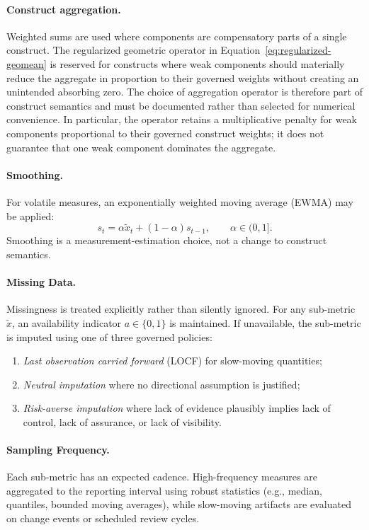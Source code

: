 \documentclass[11pt]{article}
\begin{document}
\paragraph{Construct aggregation.}
Weighted sums are used where components are compensatory parts of a single construct.
The regularized geometric operator in Equation~\ref{eq:regularized-geomean} is reserved
for constructs where weak components should materially reduce the aggregate in
proportion to their governed weights without creating an unintended absorbing zero. The choice of aggregation
operator is therefore part of construct semantics and must be documented rather than
selected for numerical convenience. In particular, the operator retains a
multiplicative penalty for weak components proportional to their governed construct
weights; it does not guarantee that one weak component dominates the aggregate.

\paragraph{Smoothing.}
For volatile measures, an exponentially weighted moving average (EWMA) may be applied:
\begin{equation}
  s_t=\alpha \widetilde{x}_t+(1-\alpha)s_{t-1},\qquad \alpha\in(0,1].
\end{equation}
Smoothing is a measurement-estimation choice, not a change to construct semantics.

\paragraph{Missing Data.}
Missingness is treated explicitly rather than silently ignored. For any sub-metric
$\widetilde{x}$, an availability indicator $a\in\{0,1\}$ is maintained. If
unavailable, the sub-metric is imputed using one of three governed policies:
\begin{enumerate}
  \item \emph{Last observation carried forward} (LOCF) for slow-moving quantities;
  \item \emph{Neutral imputation} where no directional assumption is justified;
  \item \emph{Risk-averse imputation} where lack of evidence plausibly implies lack of
    control, lack of assurance, or lack of visibility.
\end{enumerate}

\paragraph{Sampling Frequency.}
Each sub-metric has an expected cadence. High-frequency measures are aggregated to the
reporting interval using robust statistics (e.g., median, quantiles, bounded moving
averages), while slow-moving artifacts are evaluated on change events or scheduled
review cycles.
\end{document}

